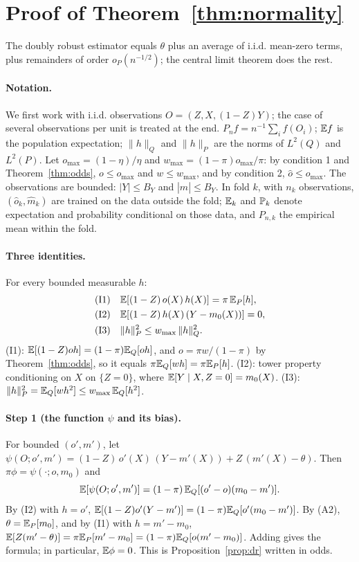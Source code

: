 \section{Proof of Theorem~\ref{thm:normality}}\label{app:proof}

The doubly robust estimator equals $\theta$ plus an average of i.i.d. mean-zero terms, plus remainders of order $o_P(n^{-1/2})$; the central limit theorem does the rest.

\paragraph{Notation.} We first work with i.i.d. observations $O=(Z,X,(1-Z)Y)$; the case of several observations per unit is treated at the end. $P_nf=n^{-1}\sum_if(O_i)$; $\mathbb{E} f$ is the population expectation; $\|h\|_Q$ and $\|h\|_P$ are the norms of $L^2(Q)$ and $L^2(P)$. Let $o_{\max}=(1-\eta)/\eta$ and $w_{\max}=(1-\pi)o_{\max}/\pi$: by condition 1 and Theorem~\ref{thm:odds}, $o\le o_{\max}$ and $w\le w_{\max}$, and by condition 2, $\hat o\le o_{\max}$. The observations are bounded: $|Y|\le B_Y$ and $|\hat m|\le B_Y$. In fold $k$, with $n_k$ observations, $(\hat o_k,\hat m_k)$ are trained on the data outside the fold; $\mathbb{E}_k$ and $\mathbb{P}_k$ denote expectation and probability conditional on those data, and $P_{n,k}$ the empirical mean within the fold.

\paragraph{Three identities.} For every bounded measurable $h$:
\begin{align*}
&\text{(I1)}\quad \mathbb{E}[(1-Z)\,o(X)\,h(X)]=\pi\,\mathbb{E}_P[h],\\
&\text{(I2)}\quad \mathbb{E}[(1-Z)\,h(X)\,(Y-m_0(X))]=0,\\
&\text{(I3)}\quad \|h\|_P^2\le w_{\max}\,\|h\|_Q^2 .
\end{align*}
(I1): $\mathbb{E}[(1-Z)oh]=(1-\pi)\mathbb{E}_Q[oh]$, and $o=\pi w/(1-\pi)$ by Theorem~\ref{thm:odds}, so it equals $\pi\mathbb{E}_Q[wh]=\pi\mathbb{E}_P[h]$. (I2): tower property conditioning on $X$ on $\{Z=0\}$, where $\mathbb{E}[Y\mid X,Z=0]=m_0(X)$. (I3): $\|h\|_P^2=\mathbb{E}_Q[wh^2]\le w_{\max}\,\mathbb{E}_Q[h^2]$.

\paragraph{Step 1 (the function $\psi$ and its bias).} For bounded $(o',m')$, let $\psi(O;o',m')=(1-Z)\,o'(X)\,(Y-m'(X))+Z\,(m'(X)-\theta)$. Then $\pi\phi=\psi(\cdot;o,m_0)$ and
\[
\mathbb{E}[\psi(O;o',m')]=(1-\pi)\,\mathbb{E}_Q[(o'-o)(m_0-m')].
\]
By (I2) with $h=o'$, $\mathbb{E}[(1-Z)o'(Y-m')]=(1-\pi)\mathbb{E}_Q[o'(m_0-m')]$. By (A2), $\theta=\mathbb{E}_P[m_0]$, and by (I1) with $h=m'-m_0$, $\mathbb{E}[Z(m'-\theta)]=\pi\mathbb{E}_P[m'-m_0]=(1-\pi)\mathbb{E}_Q[o(m'-m_0)]$. Adding gives the formula; in particular, $\mathbb{E}\phi=0$. This is Proposition~\ref{prop:dr} written in odds.

